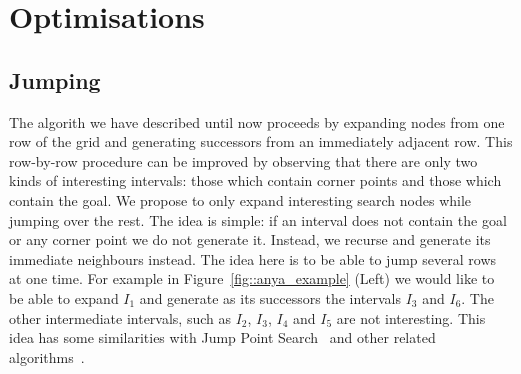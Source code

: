 \section{Optimisations}
\label{sec::optimisations}



\subsection{Jumping}
The algorith we have described until now proceeds by expanding nodes
from one row of the grid and generating successors from an immediately
adjacent row. This row-by-row procedure can be improved by observing
that there are only two kinds of interesting intervals:
those which contain corner points and those which contain the goal.
We propose to only expand interesting search nodes while jumping
over the rest. The idea is simple:
if an interval does not contain the goal or any corner point we
do not generate it. Instead, we recurse and generate its immediate
neighbours instead. The idea here is to be able to jump several
rows at one time. For example in Figure~\ref{fig::anya_example} (Left)
we would like to be able to expand $I_1$ and generate as its successors
the intervals $I_3$ and $I_6$. The other intermediate intervals, such
as $I_2$, $I_3$, $I_4$ and $I_5$ are not interesting.
This idea has some similarities with Jump Point Search~\cite{harabor11b}
and other related algorithms~\cite{haraborG14}.

%
